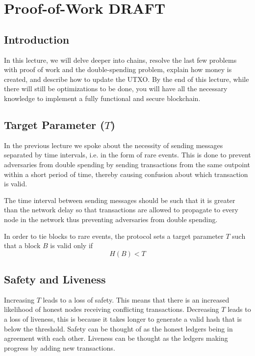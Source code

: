 \chapter{Proof-of-Work \small{\textsf{DRAFT}}}\label{chapter:pow}

\section{Introduction}

In this lecture, we will delve deeper into chains, resolve the last few problems with proof of work and the double-spending problem, explain how money is created, and describe how to update the UTXO. By the end of this lecture, while there will still be optimizations to be done, you will have all the necessary knowledge to implement a fully functional and secure blockchain.

\section{Target Parameter ($T$)}

In the previous lecture we spoke about the necessity of sending messages separated by time intervals, i.e. in the form of rare events. This is done to prevent adversaries from double spending by sending transactions from the same outpoint within a short period of time, thereby causing confusion about which transaction is valid.

The time interval between sending messages should be such that it is greater than the network delay so that transactions are allowed to propagate to every node in the network thus preventing adversaries from double spending.

In order to tie blocks to rare events, the protocol sets a target parameter $T$ such that a block $B$ is valid only if
\begin{equation}
    H(B) < T
\end{equation}

\section{Safety and Liveness}

Increasing $T$ leads to a loss of safety. This means that there is an increased likelihood of honest nodes receiving conflicting transactions.
Decreasing $T$ leads to a loss of liveness, this is because it takes longer to generate a valid hash that is below the threshold.
Safety can be thought of as the honest ledgers being in agreement with each other.
Liveness can be thought as the ledgers making progress by adding new transactions.

